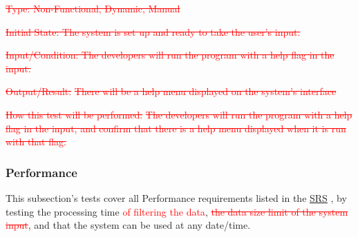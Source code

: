 \documentclass[12pt, titlepage]{article}
\begin{document}
\begin{enumerate}
{\textcolor{red}{\sout{Type: Non-Functional, Dynamic, Manual}}}
					
{\textcolor{red}{\sout{Initial State: The system is set up and ready to take the user's input.}}}

{\textcolor{red}{\sout{Input/Condition: The developers will run the program with a help flag in the input.}}}
			
{\textcolor{red}{\sout{Output/Result: }}}
{\textcolor{red}{\sout{There will be a help menu displayed on the system's interface}}}

{\textcolor{red}{\sout{How this test will be performed:}}}
{\textcolor{red}{\sout{The developers will run the program with a help flag in the input, and confirm that there is a help menu displayed when it is run with that flag.}}}

\end{enumerate}

\subsubsection{Performance}
This subsection's tests cover all Performance requirements listed in the \href{https://github.com/paezha/PyERT-BLACK/blob/main/docs/SRS/SRS.pdf}{SRS} \citep{SRS}, by testing the processing time \textcolor{red}{of filtering the data}, \textcolor{red}{\sout{the data size limit of the system input}}, and that the system can be used at any date/time. 
\end{document}
